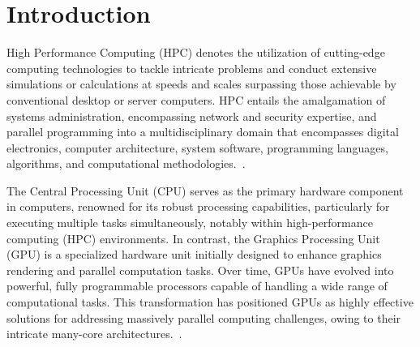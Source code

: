 \section{Introduction}


\par
High Performance Computing (HPC) denotes the utilization of cutting-edge computing technologies to tackle intricate problems and conduct extensive simulations or calculations at speeds and scales surpassing those achievable by conventional desktop or server computers.
HPC entails the amalgamation of systems administration, encompassing network and security expertise, and parallel programming into a multidisciplinary domain that encompasses digital electronics, computer architecture, system software, programming languages, algorithms, and computational methodologies.~\cite{hpc}.


\par
The Central Processing Unit (CPU) serves as the primary hardware component in computers, renowned for its robust processing capabilities, particularly for executing multiple tasks simultaneously, notably within high-performance computing (HPC) environments. In contrast, the Graphics Processing Unit (GPU) is a specialized hardware unit initially designed to enhance graphics rendering and parallel computation tasks. Over time, GPUs have evolved into powerful, fully programmable processors capable of handling a wide range of computational tasks. This transformation has positioned GPUs as highly effective solutions for addressing massively parallel computing challenges, owing to their intricate many-core architectures.~\cite{gpu_wiki}.


\par

